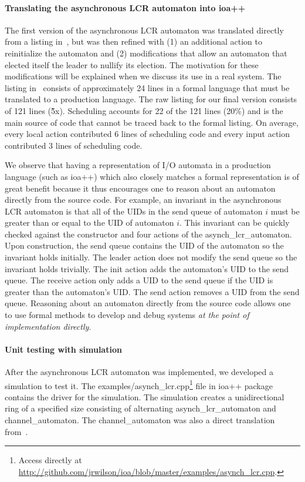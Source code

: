 \paragraph*{Translating the asynchronous LCR automaton into ioa++}
The first version of the asynchronous LCR automaton was translated directly from a listing in~\cite{lynch1996distributed}, but was then refined with (1) an additional action to reinitialize the automaton and (2) modifications that allow an automaton that elected itself the leader to nullify its election.
The motivation for these modifications will be explained when we discuss its use in a real system.
The listing in~\cite{lynch1996distributed} consists of approximately 24 lines in a formal language that must be translated to a production language.
The raw listing for our final version consists of 121 lines (\~5x).
Scheduling accounts for 22 of the 121 lines (20\%) and is the main source of code that cannot be traced back to the formal listing.
On average, every local action contributed 6 lines of scheduling code and every input action contributed 3 lines of scheduling code.

We observe that having a representation of I/O automata in a production language (such as ioa++) which also closely matches a formal representation is of great benefit because it thus encourages one to reason about an automaton directly from the source code.
For example, an invariant in the asynchronous LCR automaton is that all of the UIDs in the send queue of automaton $i$ must be greater than or equal to the UID of automaton $i$.
This invariant can be quickly checked against the constructor and four actions of the asynch\_lcr\_automaton.
Upon construction, the send queue contains the UID of the automaton so the invariant holds initially.
The leader action does not modify the send queue so the invariant holds trivially.
The init action adds the automaton's UID to the send queue.
The receive action only adds a UID to the send queue if the UID is greater than the automaton's UID.
The send action removes a UID from the send queue.
Reasoning about an automaton directly from the source code allows one to use formal methods to develop and debug systems \emph{at the point of implementation directly}.

\paragraph*{Unit testing with simulation}
After the asynchronous LCR automaton was implemented, we developed a simulation to test it.
The examples/asynch\_lcr.cpp\footnote{Access directly at \url{http://github.com/jrwilson/ioa/blob/master/examples/asynch_lcr.cpp}.} file in ioa++ package contains the driver for the simulation.
The simulation creates a unidirectional ring of a specified size consisting of alternating asynch\_lcr\_automaton and channel\_automaton.
The channel\_automaton was also a direct translation from~\cite{lynch1996distributed}.


